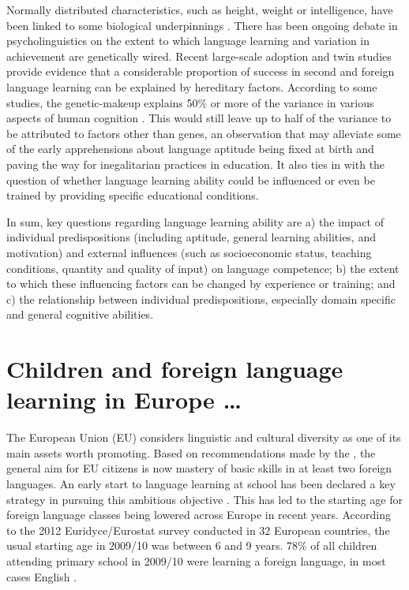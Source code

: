 \documentclass[output=paper]{langsci/langscibook}
\begin{document}
Normally distributed characteristics, such as height, weight or intelligence, have been linked to some biological underpinnings \citep{Reiterer2019}. There has been ongoing debate in psycholinguistics on the extent to which language learning and variation in achievement are genetically wired. Recent large-scale adoption and twin studies provide evidence that a considerable proportion of success in second and foreign language learning can be explained by hereditary factors. According to some studies, the genetic-makeup explains 50\% or more of the variance in various aspects of human cognition \citep{DaleEtAl2010, Stromswold2001, RimfeldEtAl2015}. This would still leave up to half of the variance to be attributed to factors other than genes, an observation that may alleviate some of the early apprehensions about language aptitude being fixed at birth and paving the way for inegalitarian practices in education. It also ties in with the question of whether language learning ability could be influenced or even be trained by providing specific educational conditions. 

In sum, key questions regarding language learning ability are a) the impact of individual predispositions (including aptitude, general learning abilities, and motivation) and external influences (such as socioeconomic status, teaching conditions, quantity and quality of input) on language competence; b) the extent to which these influencing factors can be changed by experience or training; and c) the relationship between individual predispositions, especially domain specific and general cognitive abilities.  

\section{Children and foreign language learning in Europe …}

The European Union (EU) considers linguistic and cultural diversity as one of its main assets worth promoting. Based on recommendations made by the \citet[19]{BarcelonaEuropeanCouncil2002}, the general aim for EU citizens is now mastery of basic skills in at least two foreign languages. An early start to language learning at school has been declared a key strategy in pursuing this ambitious objective \citep{EuropeanCommission2004}. This has led to the starting age for foreign language classes being lowered across Europe in recent years. According to the 2012 Euridyce\slash Eurostat survey conducted in 32 European countries, the usual starting age in 2009/10 was between 6 and 9 years. 78\% of all children attending primary school in 2009/10 were learning a foreign language, in most cases English \citep[10f]{Eurostat2012}.
\end{document}
